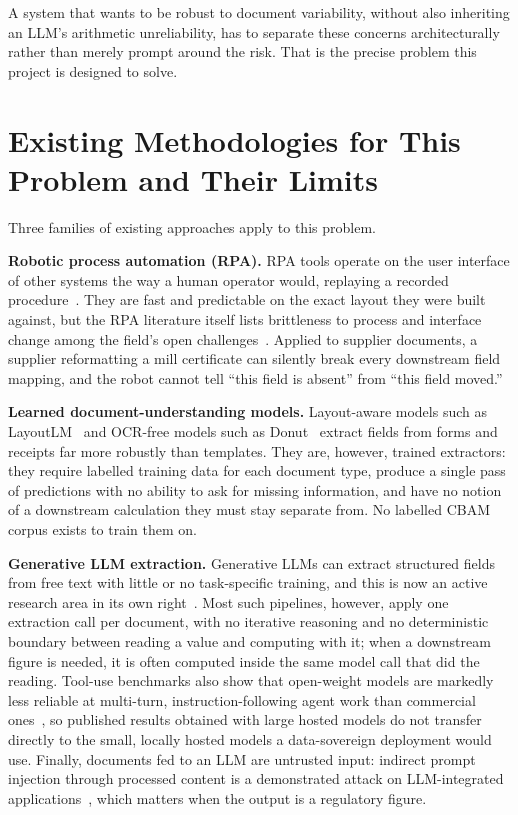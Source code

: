 A system that wants to be robust to document variability, without also
inheriting an LLM's arithmetic unreliability, has to separate these
concerns architecturally rather than merely prompt around the risk. That
is the precise problem this project is designed to solve.

\section{Existing Methodologies for This Problem and Their Limits}
\label{sec:related_work_cbam}

Three families of existing approaches apply to this problem.

\textbf{Robotic process automation (RPA).} RPA tools operate on the user
interface of other systems the way a human operator would, replaying a
recorded procedure~\cite{vanderaalst2018rpa}. They are fast and
predictable on the exact layout they were built against, but the RPA
literature itself lists brittleness to process and interface change among
the field's open challenges~\cite{syed2020rpa}. Applied to supplier
documents, a supplier reformatting a mill certificate can silently break
every downstream field mapping, and the robot cannot tell ``this field is
absent'' from ``this field moved.''

\textbf{Learned document-understanding models.} Layout-aware models such as
LayoutLM~\cite{xu2020layoutlm} and OCR-free models such as
Donut~\cite{kim2022donut} extract fields from forms and receipts far more
robustly than templates. They are, however, trained extractors: they
require labelled training data for each document type, produce a single
pass of predictions with no ability to ask for missing information, and
have no notion of a downstream calculation they must stay separate from.
No labelled CBAM corpus exists to train them on.

\textbf{Generative LLM extraction.} Generative LLMs can extract structured
fields from free text with little or no task-specific training, and this
is now an active research area in its own right~\cite{xu2023genie}. Most
such pipelines, however, apply one extraction call per document, with no
iterative reasoning and no deterministic boundary between reading a value
and computing with it; when a downstream figure is needed, it is often
computed inside the same model call that did the reading. Tool-use
benchmarks also show that open-weight models are markedly less reliable
at multi-turn, instruction-following agent work than commercial
ones~\cite{liu2024agentbench}, so published results obtained with large
hosted models do not transfer directly to the small, locally hosted
models a data-sovereign deployment would use. Finally, documents fed to
an LLM are untrusted input: indirect prompt injection through processed
content is a demonstrated attack on LLM-integrated
applications~\cite{greshake2023injection}, which matters when the output
is a regulatory figure.

